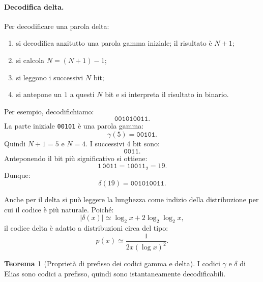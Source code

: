 \documentclass{article}
\theoremstyle{definition}
\newtheorem{theorem}{Teorema}[section] %
\numberwithin{equation}{section}
\begin{document}
\paragraph{Decodifica delta.}
Per decodificare una parola delta:
\begin{enumerate}
    \item si decodifica anzitutto una parola gamma iniziale; il risultato è $N+1$;
    \item si calcola $N=(N+1)-1$;
    \item si leggono i successivi $N$ bit;
    \item si antepone un $1$ a questi $N$ bit e si interpreta il risultato in binario.
\end{enumerate}

Per esempio, decodifichiamo:
\[
    \texttt{001010011}.
\]
La parte iniziale \texttt{00101} è una parola gamma:
\[
    \gamma(5)=\texttt{00101}.
\]
Quindi $N+1=5$ e $N=4$. I successivi $4$ bit sono:
\[
    \texttt{0011}.
\]
Anteponendo il bit più significativo si ottiene:
\[
    \texttt{1}\,\texttt{0011}=\texttt{10011}_2=19.
\]
Dunque:
\[
    \delta(19)=\texttt{001010011}.
\]

Anche per il delta si può leggere la lunghezza come indizio della distribuzione per cui il codice è più naturale. Poiché:
\[
    |\delta(x)|\simeq \log_2 x+2\log_2\log_2 x,
\]
il codice delta è adatto a distribuzioni circa del tipo:
\[
    p(x)\simeq \frac{1}{2x(\log x)^2}.
\]

\begin{theorem}[Proprietà di prefisso dei codici gamma e delta]
    I codici $\gamma$ e $\delta$ di Elias sono codici a prefisso, quindi sono istantaneamente decodificabili.
\end{theorem}
\end{document}
